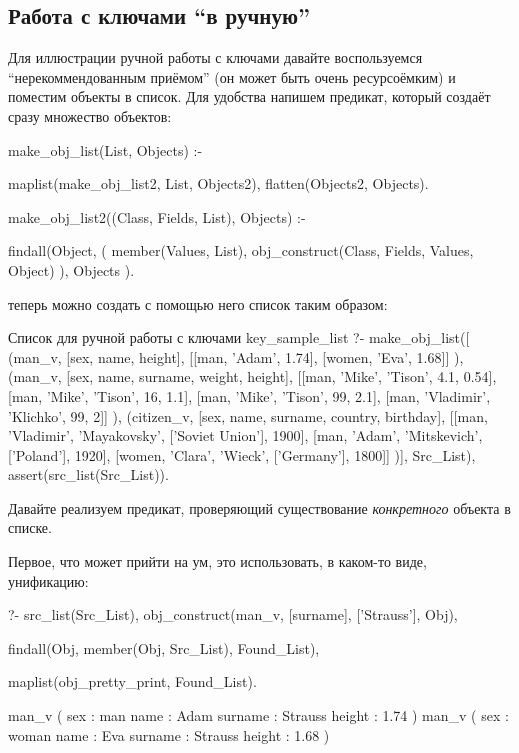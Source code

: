 \documentclass[a4paper]{book}
\begin{document}
\subsection{Работа с ключами ``в ручную''}

Для иллюстрации ручной работы с ключами давайте воспользуемся
``нерекоммендованным приёмом'' (он может быть очень ресурсоёмким)
и поместим объекты в список. Для удобства напишем предикат,
который создаёт сразу множество объектов:

\begin{example}{}{}
make_obj_list(List, Objects) :-

   maplist(make_obj_list2, List, Objects2),
   flatten(Objects2, Objects).

make_obj_list2((Class, Fields, List), Objects) :-

   findall(Object,
           (  member(Values, List),
              obj_construct(Class, Fields, Values, Object)
           ),
           Objects
          ).
\end{example}

теперь можно создать с помощью него список таким образом:

\begin{bigexample}{Список для ручной работы с ключами}%
                  {key_sample_list}
?- make_obj_list([
     (man_v, [sex, name, height],
        [[man, 'Adam', 1.74], 
         [women, 'Eva', 1.68]]
     ),
     (man_v, [sex, name, surname, weight, height],
        [[man, 'Mike', 'Tison', 4.1, 0.54],
         [man, 'Mike', 'Tison', 16, 1.1],
         [man, 'Mike', 'Tison', 99, 2.1],
         [man, 'Vladimir', 'Klichko', 99, 2]]
     ),
     (citizen_v, [sex, name, surname, country, birthday],
        [[man, 'Vladimir', 'Mayakovsky', ['Soviet Union'], 1900],
         [man, 'Adam', 'Mitskevich', ['Poland'], 1920],
         [women, 'Clara', 'Wieck', ['Germany'], 1800]]
     )],
     Src_List),
   assert(src_list(Src_List)).
\end{bigexample}

Давайте реализуем предикат, проверяющий существование {\it
  конкретного\/} объекта в списке.

Первое, что может прийти на ум, это использовать, в каком-то
виде, унификацию:

\begin{example}{}{}
?- src_list(Src_List),
   obj_construct(man_v, [surname], ['Strauss'], Obj), 

   findall(Obj, member(Obj, Src_List), Found_List), 

   maplist(obj_pretty_print, Found_List).                         

man_v ( 
  sex : man 
  name : Adam 
  surname : Strauss 
  height : 1.74 
) 
man_v ( 
  sex : woman 
  name : Eva 
  surname : Strauss 
  height : 1.68 
) 
\end{example}
\end{document}
